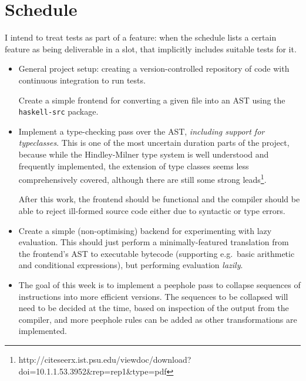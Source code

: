 \documentclass[12pt]{article}
\newcommand\monospace[1]{\texttt{#1}}
\begin{document}
\section*{Schedule}

I intend to treat tests as part of a feature: when the schedule lists a certain feature as being deliverable in a slot,
that implicitly includes suitable tests for it.




\begin{itemize}
\item
{

    General project setup: creating a version-controlled repository of code with continuous integration to run tests.

    Create a simple frontend for converting a given file into an AST using the \monospace{haskell-src} package.
}
\item
{

    Implement a type-checking pass over the AST, \textit{including support for typeclasses}. This is one of the most
    uncertain duration parts of the project, because while the Hindley-Milner type system is well understood and
    frequently implemented, the extension of type classes seems less comprehensively covered, although there are still
    some strong leads\footnote{http://citeseerx.ist.psu.edu/viewdoc/download?doi=10.1.1.53.3952\&rep=rep1\&type=pdf}.

    After this work, the frontend should be functional and the compiler should be able to reject ill-formed
    source code either due to syntactic or type errors.
}
\item
{

    Create a simple (non-optimising) backend for experimenting with lazy evaluation. This should just perform a
    minimally-featured translation from the frontend's AST to executable bytecode (supporting e.g.\ basic arithmetic and
    conditional expressions), but performing evaluation \textit{lazily}.
}
\item
{

    The goal of this week is to implement a peephole pass to collapse sequences of instructions into more efficient
    versions. The sequences to be collapsed will need to be decided at the time, based on inspection of the output from
    the compiler, and more peephole rules can be added as other transformations are implemented.
    
}
\end{itemize}
\end{document}

